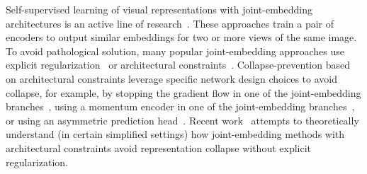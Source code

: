 \documentclass[10pt,twocolumn,letterpaper]{article}
\begin{document}
Self-supervised learning of visual representations with joint-embedding architectures is an active line of research~\cite{wu2018unsupervised,he2019moco,chen2020exploring,grill2020bootstrap,chen2020mocov2,caron2021emerging,bardes2021vicreg,zhou2021ibotyes,bordes2022guillotine,mitrovic2020representation,assran2020supervision}.
These approaches train a pair of encoders to output similar embeddings for two or more views of the same image.
To avoid pathological solution, many popular joint-embedding approaches use explicit regularization~\cite{chen2020simple, caron2021emerging, bardes2021vicreg, assran2021semi} or architectural constraints~\cite{grill2020bootstrap,chen2020exploring}.
Collapse-prevention based on architectural constraints leverage specific network design choices to avoid collapse, for example, by stopping the gradient flow in one of the joint-embedding branches~\cite{chen2020simple}, using a momentum encoder in one of the joint-embedding branches~\cite{grill2020bootstrap}, or using an asymmetric prediction head~\cite{grill2020bootstrap, chen2020simple, baevski2022data2vec}.
Recent work~\cite{tian2021understanding} attempts to theoretically understand (in certain simplified settings) how joint-embedding methods with architectural constraints avoid representation collapse without explicit regularization.
\end{document}

